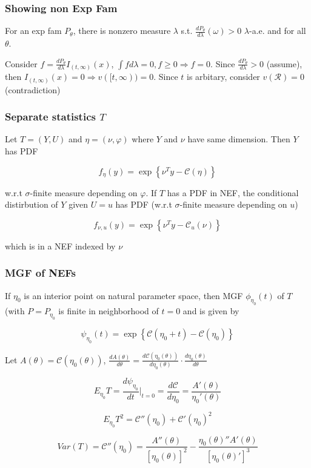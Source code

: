 \subsubsection{Showing non Exp Fam}
For an exp fam $P_\theta$, there is nonzero measure $\lambda$ s.t. $\frac{dP_\theta}{d\lambda}(\omega)>0$ $\lambda$-a.e. and for all $\theta$.

Consider $f=\frac{dP_\theta}{d\lambda}I_{(t, \infty)}(x)$,
$\int fd\lambda=0, f\geq 0\Rightarrow f=0$. Since $\frac{dP_\theta}{d\lambda}>0$ (assume), then $I_{(t, \infty)}(x)=0\Rightarrow v([t, \infty))=0$. Since $t$ is arbitary, consider $v(\mathcal{R})=0$ (contradiction)

\subsubsection{Separate statistics $T$}

Let $T=(Y, U)$ and $\eta=(\nu, \varphi)$ where $Y$ and $\nu$ have same dimension. Then $Y$ has PDF

$$
f_\eta(y)=\exp\left\{\nu^T y - \mathcal{C}(\eta)\right\}
$$

w.r.t $\sigma$-finite measure depending on $\varphi$.
If $T$ has a PDF in NEF, the conditional distirbution of $Y$ given $U=u$ has PDF (w.r.t $\sigma$-finite measure depending on $u$)

$$
f_{\nu, u}(y) = \exp\left\{\nu^T y - \mathcal{C}_u(\nu)\right\}
$$

which is in a NEF indexed by $\nu$

\subsubsection{MGF of NEFs} If $\eta_0$ is an interior point on natural parameter space, then MGF $\phi_{\eta_0}(t)$ of $T$ (with $P=P_{\eta_0}$ is finite in neighborhood of $t=0$ and is given by

$$
\psi_{\eta_0}(t) = \exp\left\{\mathcal{C}(\eta_0+t)-\mathcal{C}(\eta_0)\right\}
$$

Let $A(\theta)=\mathcal{C}(\eta_0(\theta))$, $\frac{dA(\theta)}{d\theta}=\frac{d\mathcal{C}(\eta_0(\theta))}{d\eta_0(\theta)}\cdot\frac{d\eta_0(\theta)}{d\theta}$

$$
E_{\eta_0} T = \frac{d\psi_{\eta_0}}{dt}|_{t=0} = \frac{d\mathcal{C}}{d\eta_0}
=\frac{A'(\theta)}{\eta_0'(\theta)}$$

$$
E_{\eta_0}T^2 = \mathcal{C}''(\eta_0) + \mathcal{C}'(\eta_0)^2
$$

$$
Var(T) = \mathcal{C}''(\eta_0) = \frac{A''(\theta)}{[\eta_0(\theta)]^2} - \frac{\eta_0(\theta)''A'(\theta)}{[\eta_0(\theta)']^3}
$$

